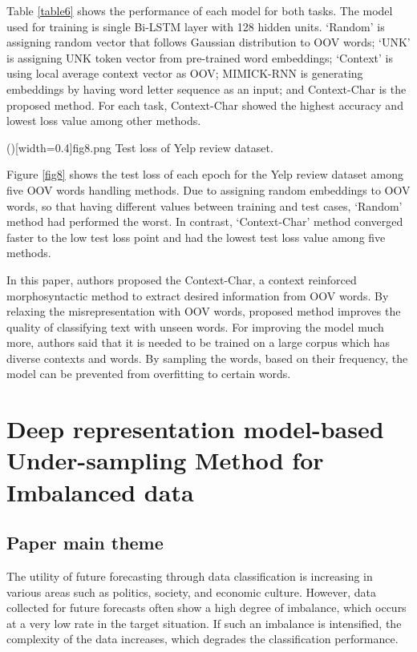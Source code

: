 \documentclass{ieeeaccess}
\begin{document}
Table \ref{table6} shows the performance of each model for both tasks. The model used for training is single Bi-LSTM layer with 128 hidden units. 
‘Random’ is assigning random vector that follows Gaussian distribution to OOV words; 
‘UNK’ is assigning UNK token vector from pre-trained word embeddings; 
‘Context’ is using local average context vector as OOV; 
MIMICK-RNN is generating embeddings by having word letter sequence as an input; 
and Context-Char is the proposed method. 
For each task, Context-Char showed the highest accuracy and lowest loss value among other methods.

\Figure[t]()[width=0.4\textwidth]{fig8.png}
   {Test loss of Yelp review dataset.\label{fig8}}

Figure \ref{fig8} shows the test loss of each epoch for the Yelp review dataset among five OOV words handling methods.
Due to assigning random embeddings to OOV words, so that having different values between training and test cases, ‘Random’ method had performed the worst. 
In contrast, ‘Context-Char’ method converged faster to the low test loss point and had the lowest test loss value among five methods. 

In this paper, authors proposed the Context-Char, a context reinforced morphosyntactic method to extract desired information from OOV words. 
By relaxing the misrepresentation with OOV words, proposed method improves the quality of classifying text with unseen words.
For improving the model much more, authors said that it is needed to be trained on a large corpus which has diverse contexts and words. 
By sampling the words, based on their frequency, the model can be prevented from overfitting to certain words.


\section{Deep representation model-based Under-sampling Method for Imbalanced data}
\label{fifth}
\subsection{Paper main theme}
The utility of future forecasting through data classification is increasing in various areas such as politics, society, and economic culture.
However, data collected for future forecasts often show a high degree of imbalance, which occurs at a very low rate in the target situation.
If such an imbalance is intensified, the complexity of the data increases, which degrades the classification performance.
\end{document}
